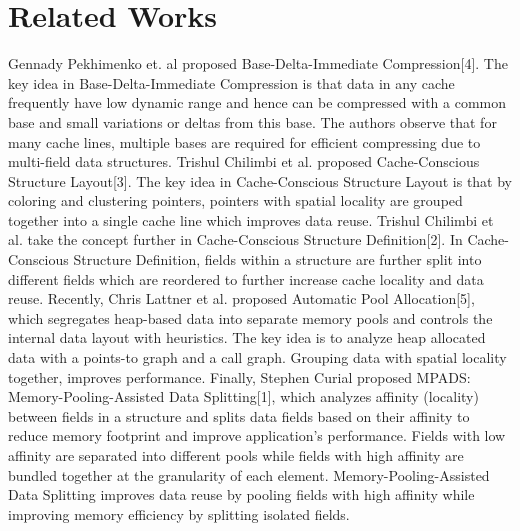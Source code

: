 \section{Related Works}
\label{sec:rel}

Gennady Pekhimenko et. al proposed Base-Delta-Immediate Compression[4]. The key
idea in Base-Delta-Immediate Compression is that data in any cache frequently
have low dynamic range and hence can be compressed with a common base and small
variations or deltas from this base. The authors observe that for many cache
lines, multiple bases are required for efficient compressing due to multi-field
data structures. Trishul Chilimbi et al. proposed Cache-Conscious Structure
Layout[3]. The key idea in Cache-Conscious Structure Layout is that by coloring
and clustering pointers, pointers with spatial locality are grouped together
into a single cache line which improves data reuse. Trishul Chilimbi et al. take
the concept further in Cache-Conscious Structure Definition[2]. In
Cache-Conscious Structure Definition, fields within a structure are further
split into different fields which are reordered to further increase cache
locality and data reuse. Recently, Chris Lattner et al. proposed Automatic Pool
Allocation[5], which segregates heap-based data into separate memory pools and
controls the internal data layout with heuristics. The key idea is to analyze
heap allocated data with a points-to graph and a call graph. Grouping data with
spatial locality together, improves performance. Finally, Stephen Curial
proposed MPADS: Memory-Pooling-Assisted Data Splitting[1], which analyzes
affinity (locality) between fields in a structure and splits data fields based
on their affinity to reduce memory footprint and improve application’s
performance. Fields with low affinity are separated into different pools while
fields with high affinity are bundled together at the granularity of each
element. Memory-Pooling-Assisted Data Splitting improves data reuse by pooling
fields with high affinity while improving memory efficiency by splitting
isolated fields.
